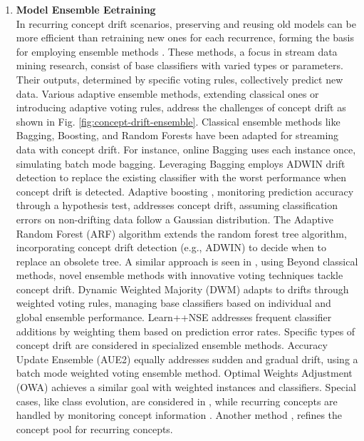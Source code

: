 \begin{enumerate}[label=\Alph*.]
\item \textbf{Model Ensemble Eetraining} \\
In recurring concept drift scenarios, preserving and reusing old models can be more efficient than retraining new ones for each recurrence, forming the basis for employing ensemble methods \cite{sun2018concept}. These methods, a focus in stream data mining research, consist of base classifiers with varied types or parameters. Their outputs, determined by specific voting rules, collectively predict new data. Various adaptive ensemble methods, extending classical ones or introducing adaptive voting rules, address the challenges of concept drift as shown in Fig. \ref{fig:concept-drift-ensemble}.
Classical ensemble methods like Bagging, Boosting, and Random Forests have been adapted for streaming data with concept drift. For instance, online Bagging \cite{oza2001experimental} uses each instance once, simulating batch mode bagging. Leveraging Bagging \cite{bifet2009new} employs ADWIN drift detection to replace the existing classifier with the worst performance when concept drift is detected.
 Adaptive boosting \cite{chu2004fast}, monitoring prediction accuracy through a hypothesis test, addresses concept drift, assuming classification errors on non-drifting data follow a Gaussian distribution. The Adaptive Random Forest (ARF) algorithm \cite{gomes2017adaptive} extends the random forest tree algorithm, incorporating concept drift detection (e.g., ADWIN) to decide when to replace an obsolete tree. A similar approach is seen in \cite{li2015learning}, using Beyond classical methods, novel ensemble methods with innovative voting techniques tackle concept drift. Dynamic Weighted Majority (DWM) \cite{kolter2007dynamic} adapts to drifts through weighted voting rules, managing base classifiers based on individual and global ensemble performance. Learn++NSE \cite{elwell2011incremental} addresses frequent classifier additions by weighting them based on prediction error rates.
 Specific types of concept drift are considered in specialized ensemble methods. Accuracy Update Ensemble (AUE2) \cite{brzezinski2013reacting} equally addresses sudden and gradual drift, using a batch mode weighted voting ensemble method. Optimal Weights Adjustment (OWA) \cite{zhang2008categorizing} achieves a similar goal with weighted instances and classifiers. Special cases, like class evolution, are considered in \cite{sun2016online}, while recurring concepts are handled by monitoring concept information \cite{gomes2013mining, gama2014survey}. Another method \cite{ahmadi2018modeling}, refines the concept pool for recurring concepts.
 

\end{enumerate}
